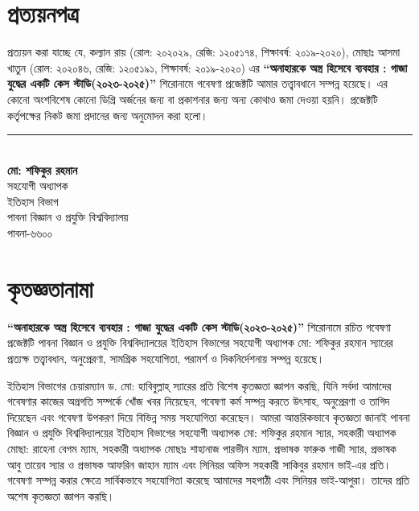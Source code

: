 \clearpage
\section*{প্রত্যয়নপত্র}

\vspace{1em}
প্রত্যয়ন করা যাচ্ছে যে, কল্যান রায় (রোল: ২০২০২৯, রেজি: ১২০৫১৭৪, শিক্ষাবর্ষ: ২০১৯-২০২০), মোছাঃ আসমা খাতুন (রোল: ২০২০৪৬, রেজি: ১২০৫১৯১, শিক্ষাবর্ষ: ২০১৯-২০২০) এর \textbf{``অনাহারকে অস্ত্র হিসেবে ব্যবহার : গাজা যুদ্ধের একটি কেস স্টাডি(২০২৩-২০২৫)''} শিরোনামে গবেষণা প্রজেক্টটি আমার তত্ত্বাবধানে সম্পন্ন হয়েছে। এর কোনো অংশবিশেষ কোনো ডিগ্রি অর্জনের জন্য বা প্রকাশনার জন্য অন্য কোথাও জমা দেওয়া হয়নি। প্রজেক্টটি কর্তৃপক্ষের নিকট জমা প্রদানের জন্য অনুমোদন করা হলো।

\vspace{3em}

\begin{flushright}
\begin{minipage}{0.5\textwidth}
\raggedleft
\rule{5cm}{0.4pt}\\[0.3em]
\textbf{মো: শফিকুর রহমান}\\
সহযোগী অধ্যাপক\\
ইতিহাস বিভাগ\\
পাবনা বিজ্ঞান ও প্রযুক্তি বিশ্ববিদ্যালয়\\
পাবনা-৬৬০০
\end{minipage}
\end{flushright}

\clearpage
\section*{কৃতজ্ঞতানামা}

\vspace{1em}
\textbf{``অনাহারকে অস্ত্র হিসেবে ব্যবহার : গাজা যুদ্ধের একটি কেস স্টাডি(২০২৩-২০২৫)''} শিরোনামে রচিত গবেষণা প্রজেক্টটি পাবনা বিজ্ঞান ও প্রযুক্তি বিশ্ববিদ্যালয়ের ইতিহাস বিভাগের সহযোগী অধ্যাপক মো: শফিকুর রহমান স্যারের প্রত্যক্ষ তত্ত্বাবধান, অনুপ্রেরণা, সামগ্রিক সহযোগিতা, পরামর্শ ও দিকনির্দেশনায় সম্পন্ন হয়েছে। 

ইতিহাস বিভাগের চেয়ারম্যান ড. মো: হাবিবুল্লাহ্ স্যারের প্রতি বিশেষ কৃতজ্ঞতা জ্ঞাপন করছি, যিনি সর্বদা আমাদের গবেষণার কাজের অগ্রগতি সম্পর্কে খোঁজ খবর নিয়েছেন, গবেষণা কর্ম সম্পন্ন করতে উৎসাহ, অনুপ্রেরণা ও তাগিদ দিয়েছেন এবং গবেষণা উপকরণ দিয়ে বিভিন্ন সময় সহযোগিতা করেছেন। আমরা আন্তরিকভাবে কৃতজ্ঞতা জানাই পাবনা বিজ্ঞান ও প্রযুক্তি বিশ্ববিদ্যালয়ের ইতিহাস বিভাগের সহযোগী অধ্যাপক মো: শফিকুর রহমান স্যার, সহকারী অধ্যাপক মোছা: রাহেনা বেগম ম্যাম, সহকারী অধ্যাপক মোছাঃ শাহানাজ পারভীন ম্যাম, প্রভাষক ফারুক গাজী স্যার, প্রভাষক আবু তায়েব স্যার ও প্রভাষক আফরিন জাহান ম্যাম এবং সিনিয়র অফিস সহকারী সাকিবুর রহমান ভাই-এর প্রতি। গবেষণা সম্পন্ন করার ক্ষেত্রে সার্বিকভাবে সহযোগিতা করেছে আমাদের সহপাঠী এবং সিনিয়র ভাই-আপুরা। তাদের প্রতি অশেষ কৃতজ্ঞতা জ্ঞাপন করছি।

